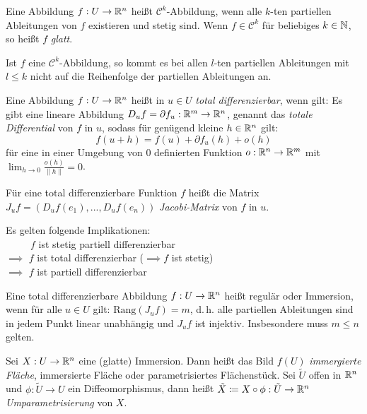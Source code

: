 \documentclass{cheat-sheet}
\begin{document}
\begin{defn}
  Eine Abbildung $f : U \to \mathbb{R}^n$ heißt $\mathcal{C}^k$-Abbildung, wenn alle $k$-ten partiellen Ableitungen von $f$ existieren und stetig sind. Wenn $f \in \mathcal{C}^k$ für beliebiges $k \in \mathbb{N}$, so heißt $f$ \emph{glatt}.
\end{defn}

\begin{satz}[Schwarz]
  Ist $f$ eine $\mathcal{C}^k$-Abbildung, so kommt es bei allen $l$-ten partiellen Ableitungen mit $l \leq k$ nicht auf die Reihenfolge der partiellen Ableitungen an.
\end{satz}

\begin{defn}
  Eine Abbildung $f : U \to \mathbb{R}^n$ heißt in $u \in U$ \emph{total differenzierbar}, wenn gilt: Es gibt eine lineare Abbildung $D_u f = \partial f_u : \mathbb{R}^m \to \mathbb{R}^n$, genannt das \emph{totale Differential} von $f$ in $u$, sodass für genügend kleine $h \in \mathbb{R}^n$ gilt:
  \[ f(u + h) = f(u) + \partial f_u(h) + o(h) \]
  für eine in einer Umgebung von $0$ definierten Funktion $o : \mathbb{R}^n \to \mathbb{R}^m$ mit $\lim_{h \to 0} \tfrac{o(h)}{\| h \|} = 0$.
\end{defn}

\begin{defn}
  Für eine total differenzierbare Funktion $f$ heißt die Matrix $J_u f = (D_u f(e_1), ..., D_u f(e_n))$ \emph{Jacobi-Matrix} von $f$ in $u$.
\end{defn}

\begin{bem}
Es gelten folgende Implikationen:\\
$\quad\quad\,\,\, f$ ist stetig partiell differenzierbar\\
$\implies$ $f$ ist total differenzierbar ($\implies f$ ist stetig)\\
$\implies$ $f$ ist partiell differenzierbar
\end{bem}


\begin{defn}
  Eine total differenzierbare Abbildung $f : U \to \mathbb{R}^n$ heißt regulär oder Immersion, wenn für alle $u \in U$ gilt: $\mathrm{Rang}(J_u f) = m$, d.\,h. alle partiellen Ableitungen sind in jedem Punkt linear unabhängig und $J_u f$ ist injektiv. Insbesondere muss $m \leq n$ gelten.
\end{defn}

\begin{defn}
  Sei $X : U \to \mathbb{R}^n$ eine (glatte) Immersion. Dann heißt das Bild $f(U)$ \emph{immergierte Fläche}, immersierte Fläche oder parametrisiertes Flächenstück. Sei $\tilde{U}$ offen in $\mathbb{R}^n$ und $\phi : \tilde{U} \to U$ ein Diffeomorphismus, dann heißt $\tilde{X} \coloneqq X \circ \phi : \tilde{U} \to \mathbb{R}^n$ \emph{Umparametrisierung} von $X$.
\end{defn}
\end{document}
